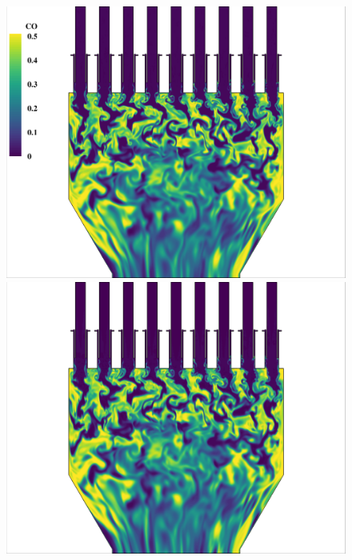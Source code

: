 \begin{figure}
	{\begin{minipage}{0.32\linewidth}
		\includegraphics[width=0.99\linewidth,trim={0.5em 0.5em 15.0em 0.5em},clip]{Chapters/HPROMResults/Images/nineElem/unsampled/fom_co_z.png}
	\end{minipage}
	\begin{minipage}{0.32\linewidth}
		\includegraphics[width=0.99\linewidth,trim={0.5em 0.5em 15.0em 0.5em},clip]{Chapters/HPROMResults/Images/nineElem/unsampled/rom_k25_co_z.png}
	\end{minipage}
	\begin{minipage}{0.32\linewidth}

\end{minipage}}
\end{figure}
